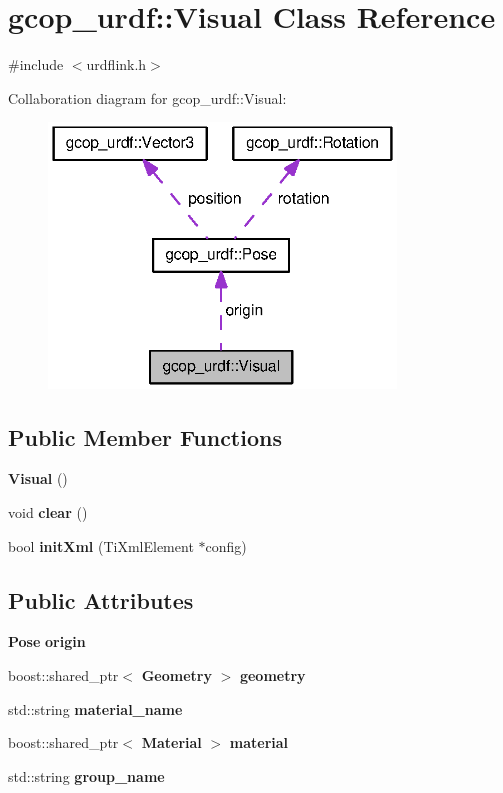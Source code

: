 \section{gcop\-\_\-urdf\-:\-:\-Visual \-Class \-Reference}
\label{classgcop__urdf_1_1Visual}


{\ttfamily \#include $<$urdflink.\-h$>$}



\-Collaboration diagram for gcop\-\_\-urdf\-:\-:\-Visual\-:\nopagebreak
\begin{figure}[H]
\begin{center}
\leavevmode
\includegraphics[width=262pt]{classgcop__urdf_1_1Visual__coll__graph}
\end{center}
\end{figure}
\subsection*{\-Public \-Member \-Functions}
\begin{DoxyCompactItemize}
\item 
{\bf \-Visual} ()
\item 
void {\bf clear} ()
\item 
bool {\bf init\-Xml} (\-Ti\-Xml\-Element $\ast$config)
\end{DoxyCompactItemize}
\subsection*{\-Public \-Attributes}
\begin{DoxyCompactItemize}
\item 
{\bf \-Pose} {\bf origin}
\item 
boost\-::shared\-\_\-ptr$<$ {\bf \-Geometry} $>$ {\bf geometry}
\item 
std\-::string {\bf material\-\_\-name}
\item 
boost\-::shared\-\_\-ptr$<$ {\bf \-Material} $>$ {\bf material}
\item 
std\-::string {\bf group\-\_\-name}
\end{DoxyCompactItemize}


